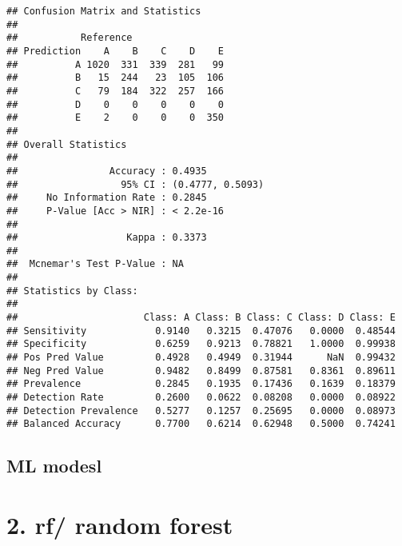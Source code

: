 \documentclass[]{article}
\newenvironment{Shaded}{\begin{snugshade}}{\end{snugshade}}
\newcommand{\CommentTok}[1]{\textcolor[rgb]{0.56,0.35,0.01}{\textit{#1}}}
\newcommand{\DataTypeTok}[1]{\textcolor[rgb]{0.13,0.29,0.53}{#1}}
\newcommand{\DecValTok}[1]{\textcolor[rgb]{0.00,0.00,0.81}{#1}}
\newcommand{\KeywordTok}[1]{\textcolor[rgb]{0.13,0.29,0.53}{\textbf{#1}}}
\newcommand{\NormalTok}[1]{#1}
\newcommand{\OperatorTok}[1]{\textcolor[rgb]{0.81,0.36,0.00}{\textbf{#1}}}
\newcommand{\StringTok}[1]{\textcolor[rgb]{0.31,0.60,0.02}{#1}}
\begin{document}
\begin{Shaded}
\end{Shaded}

\begin{verbatim}
## Confusion Matrix and Statistics
## 
##           Reference
## Prediction    A    B    C    D    E
##          A 1020  331  339  281   99
##          B   15  244   23  105  106
##          C   79  184  322  257  166
##          D    0    0    0    0    0
##          E    2    0    0    0  350
## 
## Overall Statistics
##                                           
##                Accuracy : 0.4935          
##                  95% CI : (0.4777, 0.5093)
##     No Information Rate : 0.2845          
##     P-Value [Acc > NIR] : < 2.2e-16       
##                                           
##                   Kappa : 0.3373          
##                                           
##  Mcnemar's Test P-Value : NA              
## 
## Statistics by Class:
## 
##                      Class: A Class: B Class: C Class: D Class: E
## Sensitivity            0.9140   0.3215  0.47076   0.0000  0.48544
## Specificity            0.6259   0.9213  0.78821   1.0000  0.99938
## Pos Pred Value         0.4928   0.4949  0.31944      NaN  0.99432
## Neg Pred Value         0.9482   0.8499  0.87581   0.8361  0.89611
## Prevalence             0.2845   0.1935  0.17436   0.1639  0.18379
## Detection Rate         0.2600   0.0622  0.08208   0.0000  0.08922
## Detection Prevalence   0.5277   0.1257  0.25695   0.0000  0.08973
## Balanced Accuracy      0.7700   0.6214  0.62948   0.5000  0.74241
\end{verbatim}

\hypertarget{ml-modesl}{%
\subsection{ML modesl}\label{ml-modesl}}

\hypertarget{rf-random-forest}{%
\section{2. rf/ random forest}\label{rf-random-forest}}

\begin{Shaded}
\end{Shaded}
\end{document}

